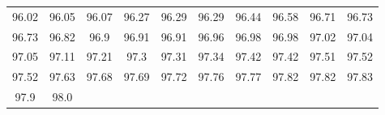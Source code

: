 \documentclass{article}
\begin{document}
\begin{enumerate}


    

    

    

    

\end{enumerate}

 \begin{tabular}{|cccccccccc|}\hline 96.02&96.05&96.07&96.27&96.29&96.29&96.44&96.58&96.71&96.73\\ 96.73&96.82&96.9&96.91&96.91&96.96&96.98&96.98&97.02&97.04\\ 97.05&97.11&97.21&97.3&97.31&97.34&97.42&97.42&97.51&97.52\\ 97.52&97.63&97.68&97.69&97.72&97.76&97.77&97.82&97.82&97.83\\ 97.9&98.0&&&&&&&&\\\hline\end{tabular}
\end{document}

